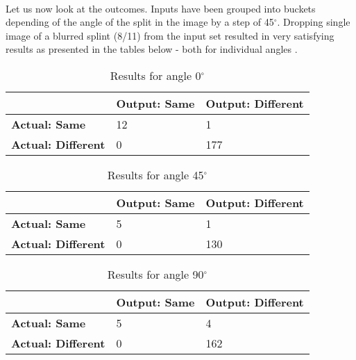 \paragraph{}
Let us now look at the outcomes. Inputs have been grouped into buckets depending of the angle of the split in the image by a step of 45$^{\circ}$. Dropping single image of a blurred splint (8/11) from the input set resulted in very satisfying results as presented in the tables below - both for individual angles .

\begin{table}[H]
    \centering
	\begin{spacing}{1.5}    
    \begin{tabular}{|l|l|l|}
        \hline
        \cellcolor{gray} & \textbf{Output: Same} & \textbf{Output: Different} \\ [0.5ex]
        \hline\hline
        \textbf{Actual: Same} & 12 & 1 \\ [0.5ex]
        \hline
        \textbf{Actual: Different} & 0 & 177 \\ [0.5ex]
        \hline
    \end{tabular}
    \end{spacing}
    \caption{Results for angle 0$^{\circ}$}
\end{table}
            
\begin{table}[H]
    \centering
	\begin{spacing}{1.5}    
    \begin{tabular}{|l|l|l|}
        \hline
        \cellcolor{gray} & \textbf{Output: Same} & \textbf{Output: Different} \\ [0.5ex]
        \hline\hline
        \textbf{Actual: Same} & 5 & 1 \\ [0.5ex]
        \hline
        \textbf{Actual: Different} & 0 & 130 \\ [0.5ex]
        \hline
    \end{tabular}
    \end{spacing}
    \caption{Results for angle 45$^{\circ}$}
\end{table}
            
\begin{table}[H]
    \centering
	\begin{spacing}{1.5}    
    \begin{tabular}{|l|l|l|}
        \hline
        \cellcolor{gray} & \textbf{Output: Same} & \textbf{Output: Different} \\ [0.5ex]
        \hline\hline
        \textbf{Actual: Same} & 5 & 4 \\ [0.5ex]
        \hline
        \textbf{Actual: Different} & 0 & 162 \\ [0.5ex]
        \hline
    \end{tabular}
    \end{spacing}
    \caption{Results for angle 90$^{\circ}$}
\end{table}
            
